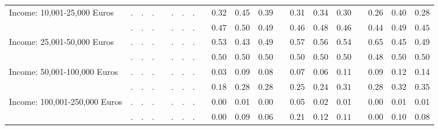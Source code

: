 \begin{center}
{\begin{longtable}{L{5cm} c c c p{.5cm} c c c p{.5cm} c c c p{.5cm} c c c p{.5cm} c c c}
 \quad Income: 10,001-25,000 Euros & . &         . &         . & &         . &         . &         . & &      0.32 &      0.45 &      0.39 & &      0.31 &      0.34 &      0.30 & &      0.26 &      0.40 &      0.28 \\*
 \quad & $\mathit{        .}$ & $\mathit{        .}$ & $\mathit{        .}$ & & $\mathit{        .}$ & $\mathit{        .}$ & $\mathit{        .}$ & & $\mathit{     0.47}$ & $\mathit{     0.50}$ & $\mathit{     0.49}$ & & $\mathit{     0.46}$ & $\mathit{     0.48}$ & $\mathit{     0.46}$ & & $\mathit{     0.44}$ & $\mathit{     0.49}$ & $\mathit{     0.45}$ \\[.2em]
 \quad Income: 25,001-50,000 Euros & . &         . &         . & &         . &         . &         . & &      0.53 &      0.43 &      0.49 & &      0.57 &      0.56 &      0.54 & &      0.65 &      0.45 &      0.49 \\*
 \quad & $\mathit{        .}$ & $\mathit{        .}$ & $\mathit{        .}$ & & $\mathit{        .}$ & $\mathit{        .}$ & $\mathit{        .}$ & & $\mathit{     0.50}$ & $\mathit{     0.50}$ & $\mathit{     0.50}$ & & $\mathit{     0.50}$ & $\mathit{     0.50}$ & $\mathit{     0.50}$ & & $\mathit{     0.48}$ & $\mathit{     0.50}$ & $\mathit{     0.50}$ \\[.2em]
 \quad Income: 50,001-100,000 Euros & . &         . &         . & &         . &         . &         . & &      0.03 &      0.09 &      0.08 & &      0.07 &      0.06 &      0.11 & &      0.09 &      0.12 &      0.14 \\*
 \quad & $\mathit{        .}$ & $\mathit{        .}$ & $\mathit{        .}$ & & $\mathit{        .}$ & $\mathit{        .}$ & $\mathit{        .}$ & & $\mathit{     0.18}$ & $\mathit{     0.28}$ & $\mathit{     0.28}$ & & $\mathit{     0.25}$ & $\mathit{     0.24}$ & $\mathit{     0.31}$ & & $\mathit{     0.28}$ & $\mathit{     0.32}$ & $\mathit{     0.35}$ \\[.2em]
 \quad Income: 100,001-250,000 Euros & . &         . &         . & &         . &         . &         . & &      0.00 &      0.01 &      0.00 & &      0.05 &      0.02 &      0.01 & &      0.00 &      0.01 &      0.01 \\*
 \quad & $\mathit{        .}$ & $\mathit{        .}$ & $\mathit{        .}$ & & $\mathit{        .}$ & $\mathit{        .}$ & $\mathit{        .}$ & & $\mathit{     0.00}$ & $\mathit{     0.09}$ & $\mathit{     0.06}$ & & $\mathit{     0.21}$ & $\mathit{     0.12}$ & $\mathit{     0.11}$ & & $\mathit{     0.00}$ & $\mathit{     0.10}$ & $\mathit{     0.08}$ \\[.2em]

\end{longtable}}
\end{center}

